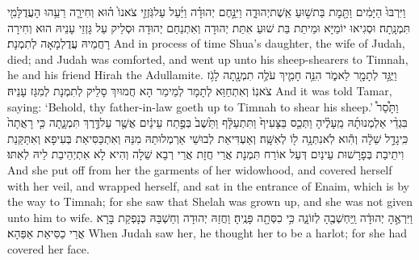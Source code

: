 {וַיִּרְבּוּ֙ הַיָּמִ֔ים וַתָּ֖מׇת בַּת\maqqaf שׁ֣וּעַ אֵֽשֶׁת\maqqaf יְהוּדָ֑ה וַיִּנָּ֣חֶם יְהוּדָ֗ה וַיַּ֜עַל עַל\maqqaf גֹּֽזְזֵ֤י צֹאנוֹ֙ ה֗וּא וְחִירָ֛ה רֵעֵ֥הוּ הָעֲדֻלָּמִ֖י תִּמְנָֽתָה׃}
{וּסְגִיאוּ יוֹמַיָּא וּמֵיתַת בַּת שׁוּעַ אִתַּת יְהוּדָה וְאִתְנַחַם יְהוּדָה וּסְלֵיק עַל גָּזְזֵי עָנֵיהּ הוּא וְחִירָה רָחֲמֵיהּ עֲדֻלְמָאָה לְתִמְנָת׃}
{And in process of time Shua’s daughter, the wife of Judah, died; and Judah was comforted, and went up unto his sheep-shearers to Timnah, he and his friend Hirah the Adullamite.}{}
{וַיֻּגַּ֥ד לְתָמָ֖ר לֵאמֹ֑ר הִנֵּ֥ה חָמִ֛יךְ עֹלֶ֥ה תִמְנָ֖תָה לָגֹ֥ז צֹאנֽוֹ׃}
{וְאִתְחַוַּא לְתָמָר לְמֵימַר הָא חֲמוּיִךְ סָלֵיק לְתִמְנָת לְמִגַּז עָנֵיהּ׃}
{And it was told Tamar, saying: ‘Behold, thy father-in-law goeth up to Timnah to shear his sheep.’}{}
{וַתָּ֩סַר֩ בִּגְדֵ֨י אַלְמְנוּתָ֜הּ מֵֽעָלֶ֗יהָ וַתְּכַ֤ס בַּצָּעִיף֙ וַתִּתְעַלָּ֔ף וַתֵּ֙שֶׁב֙ בְּפֶ֣תַח עֵינַ֔יִם אֲשֶׁ֖ר עַל\maqqaf דֶּ֣רֶךְ תִּמְנָ֑תָה כִּ֤י רָאֲתָה֙ כִּֽי\maqqaf גָדַ֣ל שֵׁלָ֔ה וְהִ֕וא לֹֽא\maqqaf נִתְּנָ֥ה ל֖וֹ לְאִשָּֽׁה׃}
{וְאַעְדִּיאַת לְבוּשֵׁי אַרְמְלוּתַהּ מִנַּהּ וְאִתְכַּסִּיאַת בְּעִיפָא וְאִתַּקַּנַת וִיתֵיבַת בְּפָרָשׁוּת עֵינַיִם דְּעַל אוֹרַח תִּמְנָת אֲרֵי חֲזָת אֲרֵי רְבָא שֵׁלָה וְהִיא לָא אִתְיְהֵיבַת לֵיהּ לְאִתּוּ׃}
{And she put off from her the garments of her widowhood, and covered herself with her veil, and wrapped herself, and sat in the entrance of Enaim, which is by the way to Timnah; for she saw that Shelah was grown up, and she was not given unto him to wife.}{}
{וַיִּרְאֶ֣הָ יְהוּדָ֔ה וַֽיַּחְשְׁבֶ֖הָ לְזוֹנָ֑ה כִּ֥י כִסְּתָ֖ה פָּנֶֽיהָ׃}
{וַחֲזַהּ יְהוּדָה וְחַשְׁבַּהּ כְּנָפְקַת בָּרָא אֲרֵי כַסִּיאַת אַפַּהָא׃}
{When Judah saw her, he thought her to be a harlot; for she had covered her face.}{}
